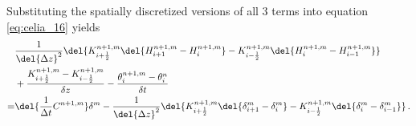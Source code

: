 Substituting the spatially discretized versions of all 3 terms into equation \eqref{eq:celia_16} yields \parencite{celia_general_1990}
\begin{align}
  \label{eq:celia_17}
  &\frac{1}{\del{ \Delta z }^2} \del{ K_{i+\frac{1}{2}}^{n+1,m} \del{ H_{i+1}^{n+1,m} - H_{i}^{n+1,m} } - K_{i-\frac{1}{2}}^{n+1,m} \del{ H_{i}^{n+1,m} - H_{i-1}^{n+1,m} } } \\
  &+ \frac{K_{i+\frac{1}{2}}^{n+1,m} - K_{i-\frac{1}{2}}^{n+1,m}}{\delta z} - \frac{\theta_i^{n+1,m} - \theta_i^{n}}{\delta t} \\
  = &\del{ \frac{1}{\Delta t} C^{n+1,m} } \delta^m - \frac{1}{\del{ \Delta z }^2} \del{ K_{i+\frac{1}{2}}^{n+1,m} \del{ \delta_{i+1}^{m} - \delta_{i}^{m} } - K_{i-\frac{1}{2}}^{n+1,m} \del{ \delta_{i}^{m} - \delta_{i-1}^{m} } }  \, .
\end{align}

